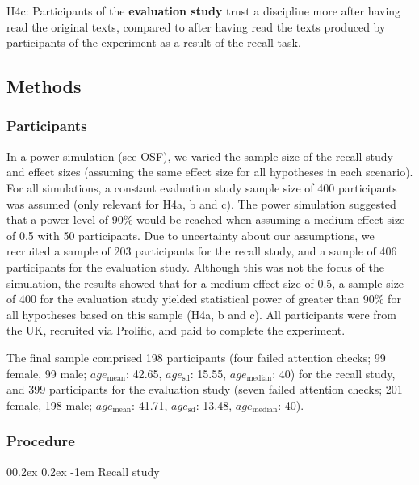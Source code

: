 \documentclass[
  english,
  doc,floatsintext]{apa6}
\makeatletter
\let\oldparagraph\paragraph
\renewcommand{\paragraph}{
    \@ifstar
      \xxxParagraphStar
      \xxxParagraphNoStar
  }
\newcommand{\xxxParagraphStar}[1]{\oldparagraph*{#1}\mbox{}}
\newcommand{\xxxParagraphNoStar}[1]{\oldparagraph{#1}\mbox{}}
\renewcommand{\paragraph}{\@startsection{paragraph}{4}{\parindent}%
  {0\baselineskip \@plus 0.2ex \@minus 0.2ex}%
  {-1em}%
  {\normalfont\normalsize\bfseries\itshape\typesectitle}}
\makeatother
\begin{document}
H4c: Participants of the \textbf{evaluation study} trust a discipline more after having read the original texts, compared to after having read the texts produced by participants of the experiment as a result of the recall task.

\subsection{Methods}\label{methods-1}

\subsubsection{Participants}\label{participants-1}

In a power simulation (see OSF), we varied the sample size of the recall study and effect sizes (assuming the same effect size for all hypotheses in each scenario). For all simulations, a constant evaluation study sample size of 400 participants was assumed (only relevant for H4a, b and c). The power simulation suggested that a power level of 90\% would be reached when assuming a medium effect size of 0.5 with 50 participants. Due to uncertainty about our assumptions, we recruited a sample of 203 participants for the recall study, and a sample of 406 participants for the evaluation study. Although this was not the focus of the simulation, the results showed that for a medium effect size of 0.5, a sample size of 400 for the evaluation study yielded statistical power of greater than 90\% for all hypotheses based on this sample (H4a, b and c). All participants were from the UK, recruited via Prolific, and paid to complete the experiment.

The final sample comprised 198 participants (four failed attention checks; 99 female, 99 male; \(age_\text{mean}\): 42.65, \(age_\text{sd}\): 15.55, \(age_\text{median}\): 40) for the recall study, and 399 participants for the evaluation study (seven failed attention checks; 201 female, 198 male; \(age_\text{mean}\): 41.71, \(age_\text{sd}\): 13.48, \(age_\text{median}\): 40).

\subsubsection{Procedure}\label{procedure-1}

\paragraph{Recall study}\label{recall-study}
\end{document}

